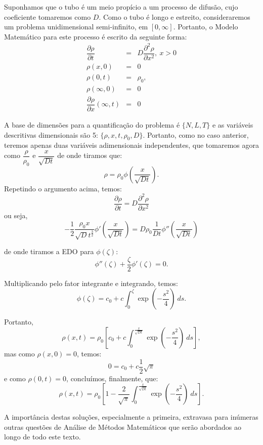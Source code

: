     Suponhamos que o tubo é um meio propício a um processo de difusão, cujo coeficiente tomaremos como \(D\). Como o tubo é longo e estreito, consideraremos um problema unidimensional semi-infinito, em \([0,\infty]\). Portanto, o Modelo Matemático para este processo é escrito da seguinte forma:
    \begin{eqnarray}
    \dfrac{\partial \rho}{\partial t} &=& D \dfrac{\partial^2 \rho}{\partial x^2},\ x > 0 \\
    \rho(x,0) &=& 0 %
    \\
    \rho(0,t) &=& \rho_0,\\
    \rho(\infty, 0) &=& 0 \\
    \dfrac{\partial \rho}{\partial x}(\infty,t) &=& 0 %
    \end{eqnarray}

    A base de dimensões para a quantificação do problema é \(\{N, L, T\}\) e as variáveis descritivas dimensionais são 5: \(\{\rho, x, t, \rho_0, D\}\). Portanto, como no caso anterior, teremos apenas duas variáveis adimensionais independentes, que tomaremos agora como \(\dfrac{\rho}{\rho_0}\) e \(\dfrac{x}{\sqrt{Dt}}\) de onde tiramos que:
    \[\rho = \rho_0 \phi\left(\dfrac{x}{\sqrt{Dt}}\right).\]
    Repetindo o argumento acima, temos:
    {\red
    \[
    \dfrac{\partial \rho}{\partial t}
    = D \dfrac{\partial^2 \rho}{\partial x^2}
    \]
    ou seja,
    \[-\dfrac{1}{2} \dfrac{\rho_0 x}{\sqrt{D} t^{\frac{3}{2}}} \phi'\left(\dfrac{x}{\sqrt{Dt}}\right)
    = D \rho_0 \dfrac{1}{Dt} \phi''\left(\dfrac{x}{\sqrt{Dt}}\right)\]}
    
    de onde tiramos a EDO para \(\phi(\zeta)\):
    \[\phi''(\zeta) + \dfrac{\zeta}{2}\phi'(\zeta) = 0.\]
    
    Multiplicando pelo fator integrante e integrando, temos:
    \[\phi(\zeta) = c_0+c\int_{0}^{\zeta} \exp\left(-\dfrac{s^2}{4}\right)\ ds.\]
    
    Portanto,
    \[\rho(x,t) = \rho_0 \left[c_0+c\int_{0}^{\frac{x}{\sqrt{Dt}}} \exp\left(-\dfrac{s^2}{4}\right)\ ds\right],\]
    mas como \(\rho(x,0) = 0\), temos:
    \[0 = c_0 + c \dfrac{1}{2} \sqrt{\pi}\]
    e como \(\rho(0,t) = 0\), concluímos, finalmente, que:
    \[\rho(x,t) = \rho_0 \left[1-\dfrac{2}{\sqrt{\pi}} \int_{0}^{\frac{x}{\sqrt{Dt}}} \exp\left(-\dfrac{s^2}{4}\right)\ ds\right].\]

    A importância destas soluções, especialmente a primeira, extravasa para inúmeras outras questões de Análise de Métodos Matemáticos que serão abordados ao longo de todo este texto.

